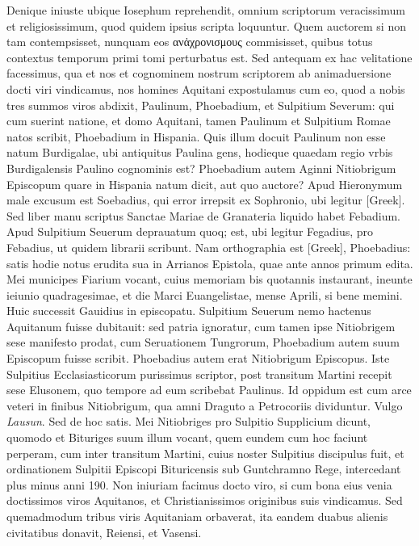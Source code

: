 Denique iniuste
ubique Iosephum reprehendit, omnium scriptorum veracissimum
et religiosissimum, quod quidem ipsius scripta loquuntur.
Quem
auctorem si non tam contempsisset, nunquam eos
 \textgreek{ανἀχρονισμους}
 commisisset,
quibus totus contextus temporum primi tomi perturbatus
est.
Sed antequam ex hac velitatione facessimus, qua et nos et cognominem
nostrum scriptorem ab animaduersione docti viri vindicamus,
nos homines Aquitani expostulamus cum eo, quod a nobis
tres summos viros abdixit, Paulinum, Phoebadium, et Sulpitium
Severum:
qui cum suerint natione, et domo Aquitani, tamen
Paulinum et Sulpitium Romae natos scribit, Phoebadium in Hispania.
Quis illum docuit Paulinum non esse natum Burdigalae, ubi
antiquitus Paulina gens, hodieque quaedam regio vrbis Burdigalensis
Paulino cognominis est?
Phoebadium autem Aginni Nitiobrigum
Episcopum quare in Hispania natum dicit, aut quo auctore?
Apud Hieronymum male excusum est Soebadius, qui error irrepsit
ex Sophronio, ubi legitur \textgreek{[Greek]}.
Sed liber manu scriptus
Sanctae Mariae de Granateria liquido habet Febadium.
Apud Sulpitium
Seuerum deprauatum quoq; est, ubi legitur Fegadius, pro
Febadius, ut quidem librarii scribunt.
Nam orthographia est \textgreek{[Greek]},
Phoebadius: satis hodie notus erudita sua in Arrianos Epistola,
quae ante  annos primum edita.
Mei municipes Fiarium vocant,
cuius memoriam bis quotannis instaurant, ineunte ieiunio
quadragesimae, et die Marci Euangelistae, mense Aprili, si bene
memini.
Huic successit Gauidius in episcopatu.
Sulpitium Seuerum
nemo hactenus Aquitanum fuisse dubitauit: sed patria ignoratur,
cum tamen ipse Nitiobrigem sese manifesto prodat, cum Seruationem
Tungrorum, Phoebadium autem suum Episcopum fuisse scribit.
Phoebadius autem erat Nitiobrigum Episcopus.
Iste Sulpitius
Ecclasiasticorum purissimus scriptor, post transitum Martini recepit
sese Elusonem, quo tempore ad eum scribebat Paulinus.
Id oppidum est cum arce veteri in finibus Nitiobrigum, qua amni Draguto
a Petrocoriis dividuntur.
Vulgo \textit{Lausun}.
Sed de hoc satis.
Mei
Nitiobriges pro Sulpitio Supplicium dicunt, quomodo et Bituriges
suum illum vocant, quem eundem cum hoc faciunt perperam,
cum inter transitum Martini, cuius noster Sulpitius discipulus fuit,
et ordinationem Sulpitii Episcopi Bituricensis sub Guntchramno
Rege, intercedant plus minus anni 190.
Non iniuriam facimus
docto viro, si cum bona eius venia doctissimos viros Aquitanos,
et Christianissimos originibus suis vindicamus.
Sed quemadmodum tribus viris Aquitaniam orbaverat, ita eandem duabus
alienis civitatibus donavit, Reiensi, et Vasensi.

